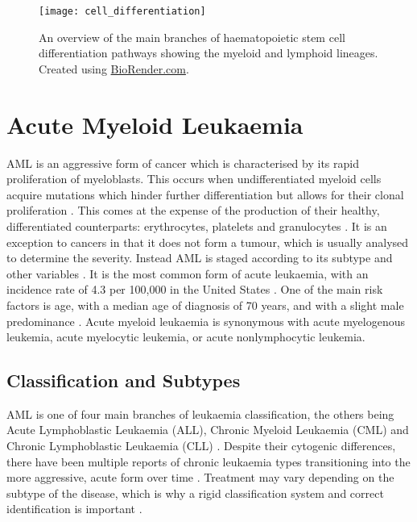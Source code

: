 \begin{figure}[!ht]
    \centering
    \texttt{[image: cell\_differentiation]}
    \caption[Stem cell differentiation]{An overview of the main branches of haematopoietic stem cell differentiation pathways showing the myeloid and lymphoid lineages. Created using \href{https://biorender.com/}{BioRender.com}. } 
    \label{fig:cell_differentiation}
\end{figure}


\section{Acute Myeloid Leukaemia}


\ac{AML} is an aggressive form of cancer which is characterised by its rapid proliferation of myeloblasts. This occurs when undifferentiated myeloid cells acquire mutations which hinder further differentiation but allows for their clonal proliferation \citep{Khwaja2016}. This comes at the expense of the production of their healthy, differentiated counterparts: erythrocytes, platelets and granulocytes \citep{Khwaja2016}. It is an exception to cancers in that it does not form a tumour, which is usually analysed to determine the severity. Instead \ac{AML} is staged according to its subtype and other variables \citep{ACS2018}. It is the most common form of acute leukaemia, with an incidence rate of 4.3 per 100,000 in the United States \citep{Kouchkovsky2016}. One of the main risk factors is age, with a median age of diagnosis of 70 years, and with a slight male predominance \citep{juliusson2009age, Khwaja2016}. Acute myeloid leukaemia is synonymous with acute myelogenous leukemia, acute myelocytic leukemia, or acute nonlymphocytic leukemia.


\subsection{Classification and Subtypes}
\label{Classification and Subtypes}
\ac{AML} is one of four main branches of leukaemia classification, the others being Acute Lymphoblastic Leukaemia (ALL), Chronic Myeloid Leukaemia (CML) and Chronic Lymphoblastic Leukaemia (CLL) \citep{leukaemiabook}. Despite their cytogenic differences, there have been multiple reports of chronic leukaemia types transitioning into the more aggressive, acute form over time \citep{kaur2016rapid, frenkel1981acute, jacobs1984acute}. Treatment may vary depending on the subtype of the disease, which is why a rigid classification system and correct identification is important \citep{leukaemiabook}.

